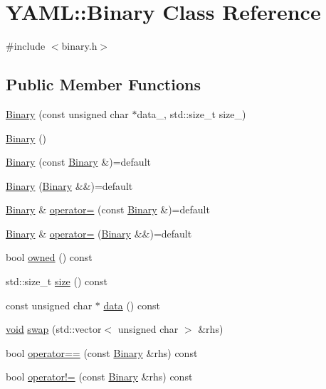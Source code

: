 \hypertarget{class_y_a_m_l_1_1_binary}{}\section{Y\+A\+ML\+::Binary Class Reference}
\label{class_y_a_m_l_1_1_binary}


{\ttfamily \#include $<$binary.\+h$>$}

\subsection*{Public Member Functions}
\begin{DoxyCompactItemize}
\item 
\mbox{\hyperlink{class_y_a_m_l_1_1_binary_a4eae01da78eb8386a4d405f497baf33c}{Binary}} (const unsigned char $\ast$data\+\_\+, std\+::size\+\_\+t size\+\_\+)
\item 
\mbox{\hyperlink{class_y_a_m_l_1_1_binary_a65696964578e5f5c5f9ec1ee9f06e1ab}{Binary}} ()
\item 
\mbox{\hyperlink{class_y_a_m_l_1_1_binary_a404eefb26378bd8c98f04510b317ffd0}{Binary}} (const \mbox{\hyperlink{class_y_a_m_l_1_1_binary}{Binary}} \&)=default
\item 
\mbox{\hyperlink{class_y_a_m_l_1_1_binary_afacd9fcc0b29ce503fcd421a1fb9759f}{Binary}} (\mbox{\hyperlink{class_y_a_m_l_1_1_binary}{Binary}} \&\&)=default
\item 
\mbox{\hyperlink{class_y_a_m_l_1_1_binary}{Binary}} \& \mbox{\hyperlink{class_y_a_m_l_1_1_binary_ac764eab8c44eb6a7375689e28e4d511e}{operator=}} (const \mbox{\hyperlink{class_y_a_m_l_1_1_binary}{Binary}} \&)=default
\item 
\mbox{\hyperlink{class_y_a_m_l_1_1_binary}{Binary}} \& \mbox{\hyperlink{class_y_a_m_l_1_1_binary_a0d7e3acae65b202ce17d4aa5207070fe}{operator=}} (\mbox{\hyperlink{class_y_a_m_l_1_1_binary}{Binary}} \&\&)=default
\item 
bool \mbox{\hyperlink{class_y_a_m_l_1_1_binary_aef431ce07caa242dce5041d7a1665c51}{owned}} () const
\item 
std\+::size\+\_\+t \mbox{\hyperlink{class_y_a_m_l_1_1_binary_ad8e9df84af8d99b005992163aeb6c956}{size}} () const
\item 
const unsigned char $\ast$ \mbox{\hyperlink{class_y_a_m_l_1_1_binary_a3820519141e9c590937dace0a3e34d5f}{data}} () const
\item 
\mbox{\hyperlink{glad_8h_a950fc91edb4504f62f1c577bf4727c29}{void}} \mbox{\hyperlink{class_y_a_m_l_1_1_binary_a7fb9a73d0230d3f9b551ce20c7d3920a}{swap}} (std\+::vector$<$ unsigned char $>$ \&rhs)
\item 
bool \mbox{\hyperlink{class_y_a_m_l_1_1_binary_a6696e8d22d09dcc1bab30fe257b5db36}{operator==}} (const \mbox{\hyperlink{class_y_a_m_l_1_1_binary}{Binary}} \&rhs) const
\item 
bool \mbox{\hyperlink{class_y_a_m_l_1_1_binary_af31e8ec0277113eace7f0508be989653}{operator!=}} (const \mbox{\hyperlink{class_y_a_m_l_1_1_binary}{Binary}} \&rhs) const
\end{DoxyCompactItemize}



